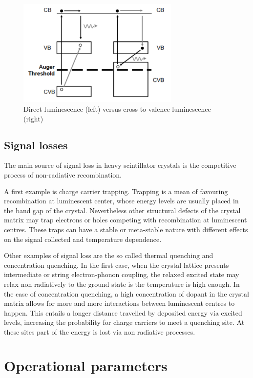 \begin{figure}[htbp]
\centering
\includegraphics[width=8cm]{../Pictures/Chapter_2/core_to_valence.pdf}
\caption[Core to valence luminescence]{Direct luminescence (left) versus cross to valence luminescence (right)}
\label{fig:CTV}
\end{figure}
 
\subsection{Signal losses}
The main source of signal loss in heavy scintillator crystals is the competitive process of non-radiative recombination.

A first example is charge carrier trapping. Trapping is a mean of favouring recombination at luminescent center, whose energy levels are usually placed in the band gap of the crystal. 
Nevertheless other structural defects of the crystal matrix may trap electrons or holes competing with recombination at luminescent centres. These traps can have a stable or meta-stable nature with different effects on the signal collected and temperature dependence. 

Other examples of signal loss are the so called thermal quenching and concentration quenching. In the first case, when the crystal lattice presents intermediate or string electron-phonon coupling, the relaxed excited state may relax non radiatively to the ground state is the temperature is high enough. In the case of concentration quenching, a high concentration of dopant in the crystal matrix allows for more and more interactions between luminescent centres to happen. This entails a longer distance travelled by deposited energy via excited levels, increasing the probability for charge carriers to meet a quenching site. At these sites part of the energy is lost via non radiative processes. 

\section{Operational parameters}
